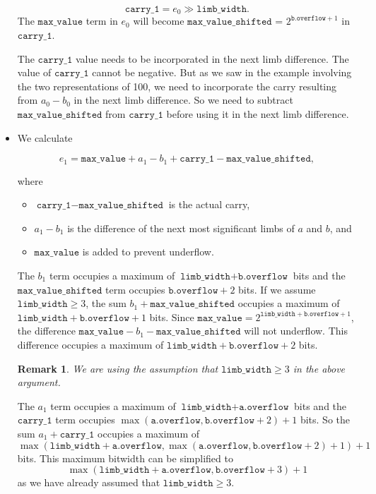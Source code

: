 \documentclass[a4paper, 12pt]{article}
\newtheorem*{remark}{Remark}
\begin{document}
\begin{itemize}
    $$\texttt{carry\_1} = e_0 \gg \texttt{limb\_width}.$$
    The $\texttt{max\_value}$ term in $e_0$ will become $\texttt{max\_value\_shifted}$ = $2^{\texttt{b.overflow}+1}$ in $\texttt{carry\_1}$.
    
    The $\texttt{carry\_1}$ value needs to be incorporated in the next limb difference. The value of $\texttt{carry\_1}$ cannot be negative. But as we saw in the example involving the two representations of 100, we need to incorporate the carry resulting from $a_0 - b_0$ in the next limb difference. So we need to subtract $\texttt{max\_value\_shifted}$ from $\texttt{carry\_1}$ before using it in the next limb difference.

  \item We calculate 

    $$e_1 = \texttt{max\_value} + a_1 - b_1 + \texttt{carry\_1} - \texttt{max\_value\_shifted},$$

    where
    \begin{itemize}
      \item $\texttt{carry\_1} - \texttt{max\_value\_shifted}$ is the actual carry,
      \item $a_1 - b_1$ is the difference of the next most significant limbs of $a$ and $b$, and
      \item $\texttt{max\_value}$ is added to prevent underflow.
    \end{itemize}
    
    The $b_1$ term occupies a maximum of $\texttt{limb\_width} + \texttt{b.overflow}$ bits and the $\texttt{max\_value\_shifted}$ term occupies $\texttt{b.overflow} + 2$ bits. If we assume $\texttt{limb\_width} \ge 3$, the sum $b_1 + \texttt{max\_value\_shifted}$ occupies a maximum of $\texttt{limb\_width} + \texttt{b.overflow} + 1$ bits. Since $\texttt{max\_value} = 2^{\texttt{limb\_width}+\texttt{b.overflow}+1}$, the difference $\texttt{max\_value} - b_1 - \texttt{max\_value\_shifted}$ will not underflow. This difference occupies a maximum of $\texttt{limb\_width} + \texttt{b.overflow} + 2$ bits.

    \begin{remark}
    We are using the assumption that $\texttt{limb\_width} \ge 3$ in the above argument.
    \end{remark}

    The $a_1$ term occupies a maximum of $\texttt{limb\_width} + \texttt{a.overflow}$ bits and the $\texttt{carry\_1}$ term occupies $\max(\texttt{a.overflow}, \texttt{b.overflow} + 2) + 1$ bits. So the sum $a_1 + \texttt{carry\_1}$ occupies a maximum of 
    $$\max(\texttt{limb\_width} + \texttt{a.overflow}, \max(\texttt{a.overflow}, \texttt{b.overflow} + 2) + 1) + 1$$
    bits. This maximum bitwidth can be simplified to 
    $$\max(\texttt{limb\_width} + \texttt{a.overflow}, \texttt{b.overflow} + 3) + 1$$
    as we have already assumed that $\texttt{limb\_width} \ge 3$.
    

\end{itemize}
\end{document}
